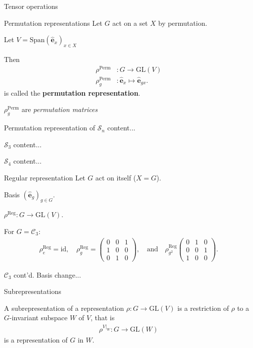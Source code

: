 \documentclass[handout,  12pt]{beamer}
\newcommand{\1}{\mathbf{1}}
\newcommand{\0}{\mathbf{0}}
\newcommand{\GL}{\text{GL}}
\newcommand{\id}{\text{id}}
\newcommand{\Sym}{\mathcal{S}} %
\newcommand{\Cyc}{\mathcal{C}}%
\newcommand{\Span}{\text{Span}}
\newcommand{\Reg}{\text{Reg}}
\newcommand{\Perm}{\text{Perm}}
\newcommand{\bas}{\mathbf{\hat{e}}}
\begin{document}
\begin{frame}{Tensor operations}
	\begin{frame}{Permutation representations}
		Let $G$ act on a set $X$ by permutation.
		
		Let $V = \Span (\bas_x)_{x \in X}$
		
		Then
		\begin{align*}
			\rho^\Perm &: G \rightarrow \GL(V) \\
			\rho^\Perm_g &: \bas_x \mapsto \bas_{gx}.
		\end{align*}
		is called the \textbf{permutation representation}.
		
		$\rho_g^\Perm$ are \textit{permutation matrices}
	\end{frame}
	
	\begin{frame}{Permutation representation of $\Sym_n$}
		content...
	\end{frame}
	
	\begin{frame}{$\Sym_3$}
		content...
	\end{frame}
	
	\begin{frame}{$\Sym_4$}
		content...
	\end{frame}
	
	\begin{frame}{Regular representation}
		Let $G$ act on itself ($X = G$).
		
		Basis $(\bas_g)_{g \in G}$.
		
		$\rho^\Reg : G \rightarrow \GL(V)$.
		
		For $G = \Cyc_3$:
		\begin{align*}
			\rho^\Reg_e = \id, \quad \rho^\Reg_g = \begin{pmatrix}
				0&0&1\\1&0&0\\0&1&0
			\end{pmatrix}, \quad \text{and} \quad \rho^\Reg_{g^2}\begin{pmatrix}
			0&1&0\\0&0&1\\1&0&0
			\end{pmatrix}.
		\end{align*}		
	\end{frame}
	
	\begin{frame}{$\Cyc_3$ cont'd.}
		Basis change...
	\end{frame}
	
	\begin{frame}{Subrepresentations}
		\begin{definition}
			A subrepresentation of a representation $\rho: G \rightarrow \GL(V)$ is a restriction of $\rho$ to a $G$-invariant subspace $W$ of $V$, that is
			\begin{align*}
				\rho^{V|_W}: G \rightarrow \GL(W)
			\end{align*}
			is a representation of $G$ in $W$.
		\end{definition}
		

\end{frame}
\end{frame}
\end{document}
